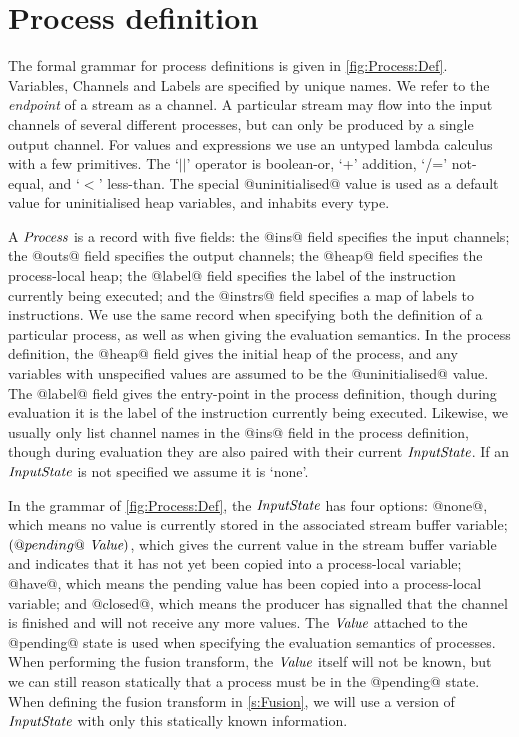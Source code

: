 \section{Process definition}
\label{kpn/process-definition}



The formal grammar for process definitions is given in \cref{fig:Process:Def}.
Variables, Channels and Labels are specified by unique names.
We refer to the \emph{endpoint} of a stream as a channel.
A particular stream may flow into the input channels of several different processes, but can only be produced by a single output channel.
For values and expressions we use an untyped lambda calculus with a few primitives.
The `$||$' operator is boolean-or, `+' addition, `/=' not-equal, and `$<$' less-than.
The special @uninitialised@ value is used as a default value for uninitialised heap variables, and inhabits every type.

A $\textit{Process}$ is a record with five fields: the @ins@ field specifies the input channels; the @outs@ field specifies the output channels; the @heap@ field specifies the process-local heap; the @label@ field specifies the label of the instruction currently being executed; and the @instrs@ field specifies a map of labels to instructions.
We use the same record when specifying both the definition of a particular process, as well as when giving the evaluation semantics.
In the process definition, the @heap@ field gives the initial heap of the process, and any variables with unspecified values are assumed to be the @uninitialised@ value.
The @label@ field gives the entry-point in the process definition, though during evaluation it is the label of the instruction currently being executed.
Likewise, we usually only list channel names in the @ins@ field in the process definition, though during evaluation they are also paired with their current $\textit{InputState}$.
If an $\textit{InputState}$ is not specified we assume it is `none'.

In the grammar of \cref{fig:Process:Def}, the $\textit{InputState}$ has four options: @none@, which means no value is currently stored in the associated stream buffer variable; $(@pending@~\textit{Value})$, which gives the current value in the stream buffer variable and indicates that it has not yet been copied into a process-local variable; @have@, which means the pending value has been copied into a process-local variable; and @closed@, which means the producer has signalled that the channel is finished and will not receive any more values.
The $\textit{Value}$ attached to the @pending@ state is used when specifying the evaluation semantics of processes.
When performing the fusion transform, the $\textit{Value}$ itself will not be known, but we can still reason statically that a process must be in the @pending@ state.
When defining the fusion transform in \cref{s:Fusion}, we will use a version of $\textit{InputState}$ with only this statically known information.


